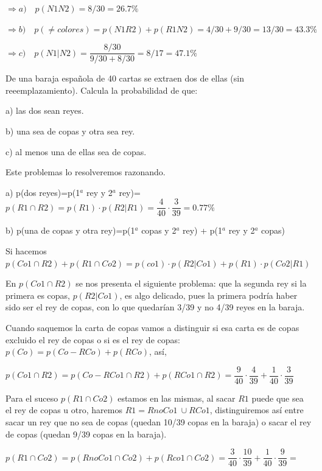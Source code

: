 \vspace{5mm}%
$\Rightarrow  a)\quad  p(N1N2)=8/30=26.7\%$


$\Rightarrow b)\quad p(\neq colores)=p(N1R2)+p(R1N2)=4/30+9/30=13/30=43.3\%$


$\Rightarrow c)\quad p(N1|N2)=\dfrac{8/30}{9/30+8/30}=8/17=47.1\%$



\vspace{5mm}
\begin{ejemplo}
\begin{ejer}
De una baraja española de 40 cartas se extraen dos de ellas (sin reeemplazamiento). Calcula la probabilidad de que:

a) las dos sean reyes.

b) una sea de copas	y otra sea rey.

c) al menos una de ellas sea de copas.
\end{ejer}
\end{ejemplo}

Este problemas lo resolveremos razonando.

a) p(dos reyes)=p(1$^a$ rey y 2$^a$ rey)=$p(R1\cap R2)=p(R1)\cdot p(R2|R1)=\dfrac 4 {40}\cdot \dfrac 3{39}=0.77\%$

b) p(una de copas y otra rey)=p(1$^a$ copas y 2$^a$ rey) + p(1$^a$ rey y 2$^a$ copas)

Si hacemos $p(Co1 \cap R2)+p(R1\cap Co2)=p(co1)\cdot p(R2|Co1)+p(R1)\cdot p(Co2|R1)$

En $p(Co1 \cap R2)$ se nos presenta el siguiente problema: que la segunda rey si la primera es copas, $p(R2|Co1)$, es algo delicado, pues la primera podría haber sido ser el rey de copas, con lo que quedarían 3/39 y no 4/39 reyes en la baraja.

Cuando saquemos la carta de copas vamos a distinguir si esa carta es de copas excluido el rey de copas o si es el rey de copas: $p(Co)=p(Co-RCo)+p(RCo)$, así, 

$p(Co1 \cap R2)=p(Co-RCo1\cap R2)+p(RCo1\cap R2)=\dfrac 9 {40} \cdot \dfrac 4{39} + \dfrac{1}{40} \cdot \dfrac 3{39}$

Para el suceso $p(R1\cap Co2)$ estamos en las mismas, al sacar $R1$ puede que sea el rey de copas u otro, haremos $R1=RnoCo1 \ \cup RCo1$, distinguiremos así entre sacar un rey que no sea de copas (quedan 10/39 copas en la baraja) o sacar el rey de copas (quedan 9/39 copas en la baraja).

$p(R1 \cap Co2)=p(RnoCo1\cap Co2)+p(Rco1\cap Co2) =\dfrac{3}{40}\cdot \dfrac{10}{39} + \dfrac{1}{40}\cdot \dfrac{9}{39} =$

